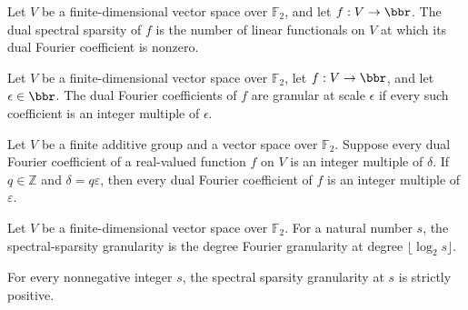 \begin{definition}
\label{FABL.dualSpectralSparsity}
\leanok
{}
Let $V$ be a finite-dimensional vector space over $\mathbb{F}_2$, and let $f:V\to\bbr$.
The dual spectral sparsity of $f$ is the number of linear functionals on $V$ at which
its dual Fourier coefficient is nonzero.
\end{definition}

\begin{definition}
\label{FABL.IsDualFourierGranular}
\leanok
{}
Let $V$ be a finite-dimensional vector space over $\mathbb{F}_2$, let $f:V\to\bbr$, and
let $\epsilon\in\bbr$. The dual Fourier coefficients of $f$ are granular at scale
$\epsilon$ if every such coefficient is an integer multiple of $\epsilon$.
\end{definition}

\begin{theorem}
\label{FABL.IsDualFourierGranular.refine}
\leanok
{}
Let $V$ be a finite additive group and a vector space over $\mathbb F_2$. Suppose every
dual Fourier coefficient of a real-valued function $f$ on $V$ is an integer multiple of
$\delta$. If $q\in\mathbb Z$ and $\delta=q\varepsilon$, then every dual Fourier
coefficient of $f$ is an integer multiple of $\varepsilon$.
\end{theorem}

\begin{definition}
\label{FABL.spectralSparsityGranularity}
\leanok
{}
Let $V$ be a finite-dimensional vector space over $\mathbb{F}_2$. For a natural number
$s$, the spectral-sparsity granularity is the degree Fourier granularity at degree
$\lfloor\log_2 s\rfloor$.
\end{definition}

\begin{theorem}
\label{FABL.spectralSparsityGranularity_pos}
\leanok
{}
For every nonnegative integer $s$, the spectral sparsity granularity at $s$ is strictly
positive.
\end{theorem}

